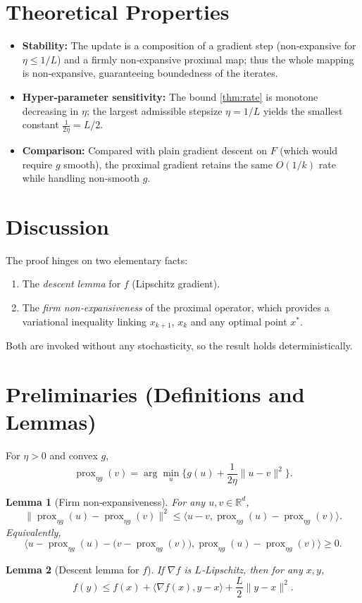 \documentclass{article}
\newtheorem{lemma}{Lemma}
\begin{document}
\section*{Theoretical Properties}
\begin{itemize}
\item \textbf{Stability:} The update is a composition of a gradient step (non‑expansive for $\eta\le1/L$) and a firmly non‑expansive proximal map; thus the whole mapping is non‑expansive, guaranteeing boundedness of the iterates.
\item \textbf{Hyper‑parameter sensitivity:} The bound \eqref{thm:rate} is monotone decreasing in $\eta$; the largest admissible stepsize $\eta=1/L$ yields the smallest constant $\frac{1}{2\eta}=L/2$.
\item \textbf{Comparison:} Compared with plain gradient descent on $F$ (which would require $g$ smooth), the proximal gradient retains the same $O(1/k)$ rate while handling non‑smooth $g$.
\end{itemize}

\section*{Discussion}
The proof hinges on two elementary facts:
\begin{enumerate}
\item The \emph{descent lemma} for $f$ (Lipschitz gradient).
\item The \emph{firm non‑expansiveness} of the proximal operator, which provides a variational inequality linking $x_{k+1}$, $x_{k}$ and any optimal point $x^{*}$.
\end{enumerate}
Both are invoked without any stochasticity, so the result holds deterministically.

\newpage
\section*{Preliminaries (Definitions and Lemmas)}
\begin{definition}\label{def:prox}
For $\eta>0$ and convex $g$,  
\[
\operatorname{prox}_{\eta g}(v)=\arg\min_{u}\Big\{g(u)+\frac{1}{2\eta}\|u-v\|^{2}\Big\}.
\]
\end{definition}
\begin{lemma}[Firm non‑expansiveness]\label{lem:firm}
For any $u,v\in\mathbb R^{d}$,
\[
\big\|\operatorname{prox}_{\eta g}(u)-\operatorname{prox}_{\eta g}(v)\big\|^{2}
\le \langle u-v,\operatorname{prox}_{\eta g}(u)-\operatorname{prox}_{\eta g}(v)\rangle .
\] 
Equivalently,
\[
\langle u-\operatorname{prox}_{\eta g}(u)-\bigl(v-\operatorname{prox}_{\eta g}(v)\bigr),
\operatorname{prox}_{\eta g}(u)-\operatorname{prox}_{\eta g}(v)\rangle\ge 0 .
\] 
\end{lemma}
\begin{lemma}[Descent lemma for $f$]\label{lem:descent}
If $\nabla f$ is $L$‑Lipschitz, then for any $x,y$,
\[
f(y)\le f(x)+\langle \nabla f(x),y-x\rangle+\frac{L}{2}\|y-x\|^{2}.
\] 
\end{lemma}
\end{document}
